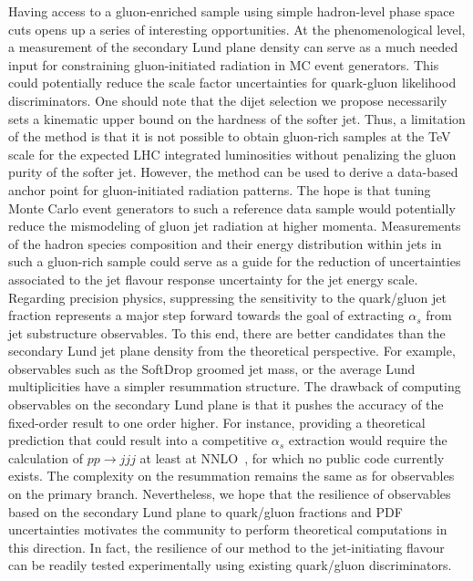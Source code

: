 \documentclass[a4paper,11pt]{article}
\begin{document}
Having access to a gluon-enriched sample using simple hadron-level phase space cuts opens up a series of interesting opportunities. At the phenomenological level, a measurement of the secondary Lund plane density can serve as a much needed input for constraining gluon-initiated radiation in MC event generators. This could potentially reduce the scale factor uncertainties for quark-gluon likelihood discriminators. One should note that the dijet selection we propose necessarily sets a kinematic upper bound on the hardness of the softer jet. Thus, a limitation of the method is that it is not possible to obtain gluon-rich samples at the TeV scale for the expected LHC integrated luminosities without penalizing the gluon purity of the softer jet. However, the method can be used to derive a data-based anchor point for gluon-initiated radiation patterns. The hope is that tuning Monte Carlo event generators to such a reference data sample would potentially reduce the mismodeling of gluon jet radiation at higher momenta.
%
Measurements of the hadron species composition and their energy distribution within jets in such a gluon-rich sample could serve as a guide for the reduction of uncertainties associated to the jet flavour response uncertainty for the jet energy scale. Regarding precision physics, suppressing the sensitivity to the quark/gluon jet fraction represents a major step forward towards the goal of extracting $\alpha_s$ from jet substructure observables. To this end, there are better candidates than the secondary Lund jet plane density from the theoretical perspective. For example, observables such as the SoftDrop groomed jet mass, or the average Lund multiplicities have a simpler resummation structure. The drawback of computing observables on the secondary Lund plane is that it pushes the accuracy of the fixed-order result to one order higher. For instance, providing a theoretical prediction that could result into a competitive $\alpha_s$ extraction would require the calculation of $pp\to jjj$ at least at NNLO~\cite{Czakon:2021mjy,ATLAS:2024png}, for which no public code currently exists. The complexity on the resummation remains the same as for observables on the primary branch. Nevertheless, we hope that the resilience of observables based on the secondary Lund plane to quark/gluon fractions and PDF uncertainties motivates the community to perform theoretical computations in this direction. In fact, the resilience of our method to the jet-initiating flavour can be readily tested experimentally using existing quark/gluon discriminators.
\end{document}
